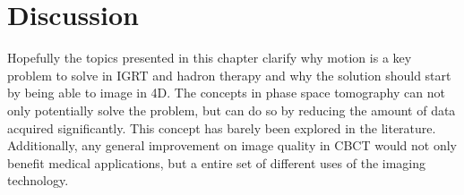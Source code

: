 \section{Discussion}

Hopefully the topics presented in this chapter clarify why motion is a key problem to solve in IGRT and hadron therapy and why the solution should start by being able to image in 4D. The concepts in phase space tomography can not only  potentially solve the problem, but can do so by reducing the amount of data acquired significantly. This concept has barely been explored in the literature. Additionally, any general improvement on image quality in CBCT would not only benefit medical applications, but a entire set of different uses of the imaging technology.